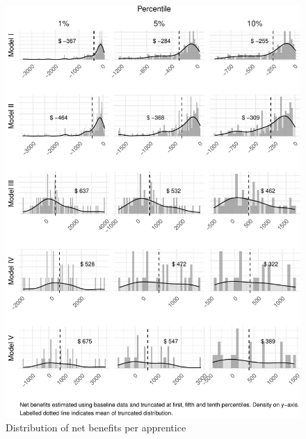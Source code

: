 \documentclass[
  11pt,
a4paper
]{article}
\begin{document}
\begin{figure}
\includegraphics[width=1\linewidth,]{figures/fig-apphist-1} \caption{Distribution of net benefits per apprentice}\label{fig:fig-apphist}
\end{figure}
\end{document}
